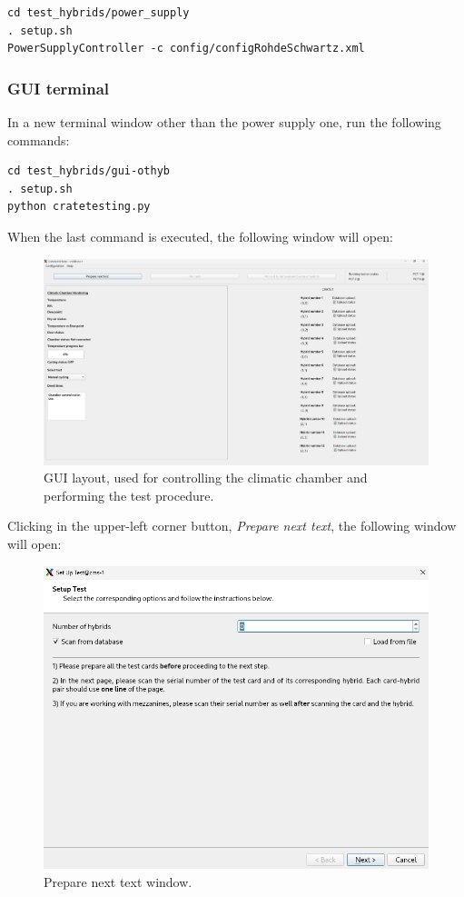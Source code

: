 \documentclass[10pt,a4paper]{article}
\begin{document}
\begin{framed}
\begin{verbatim}
cd test_hybrids/power_supply
. setup.sh
PowerSupplyController -c config/configRohdeSchwartz.xml
\end{verbatim}
\end{framed}

\subsubsection{GUI terminal}

In a new terminal window other than the power supply one, run the following commands:

\begin{framed}
\begin{verbatim}
cd test_hybrids/gui-othyb
. setup.sh 
python cratetesting.py
\end{verbatim}
\end{framed}

\newpage

When the last command is executed, the following window will open:

\begin{figure}[h!]
\centering
 \includegraphics[width=1.0\linewidth]{Pictures/GUI.png} 
  \caption{GUI layout, used for controlling the climatic chamber and performing the test procedure.}
  \label{oi}
\end{figure}

Clicking in the upper-left corner button, \textit{Prepare next text}, the following window will open:

\begin{figure}[!pbth]
\centering
 \includegraphics[width=0.7\linewidth]{Pictures/GUI-prepare.png} 
  \caption{Prepare next text window.}
  \label{tchau}
\end{figure}
\end{document}
